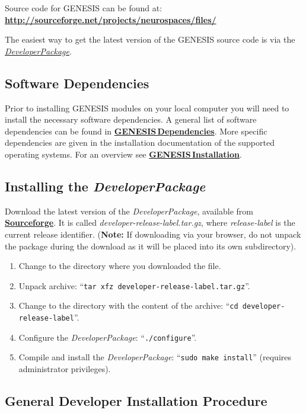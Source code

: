 \documentclass[12pt]{article}
\begin{document}
Source code for GENESIS can be found at: \href{http://sourceforge.net/projects/neurospaces/files/}{\bf http://sourceforge.net/projects/neurospaces/files/}

The easiest way to get the latest version of the GENESIS source code is via the  \href{../developer-package/developer-package.tex}{\it DeveloperPackage}.

\subsection*{Software Dependencies}

Prior to installing GENESIS modules on your local computer you will need to install the necessary software dependencies. A general list of software dependencies can be found in \href{../genesis-dependencies/genesis-dependencies.tex}{\bf GENESIS\,Dependencies}. More specific dependencies are given in the installation documentation of the supported operating systems. For an overview see \href{../genesis-installation/genesis-installation.tex}{\bf GENESIS\,Installation}.

\subsection*{Installing the {\it DeveloperPackage}}

Download the latest version of the {\it DeveloperPackage}, available from \href{http://sourceforge.net/projects/neurospaces/files/}{\bf Sourceforge}.  It is called {\it developer-release-label.tar.gz}, where {\it release-label} is the current release identifier. ({\bf Note:} If downloading via your browser, do not unpack the package during the download as it will be placed into its own subdirectory).
\begin{enumerate}
   \item Change to the directory where you downloaded the file.
   \item Unpack archive: ``{\tt tar xfz developer-release-label.tar.gz}''.
   \item Change to the directory with the content of the archive: ``{\tt cd developer-release-label}''.
   \item Configure the {\it DeveloperPackage}: ``{\tt ./configure}''.
   \item Compile and install the {\it DeveloperPackage}: ``{\tt sudo make install}'' (requires administrator privileges).
\end{enumerate}

\subsection*{General Developer Installation Procedure}
\end{document}
